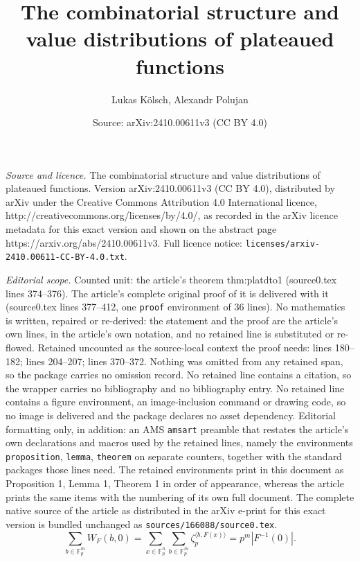 \documentclass[10pt,a4paper]{amsart}
\title{The combinatorial structure and value distributions of plateaued functions}
\author{Lukas K\"olsch, Alexandr Polujan}
\date{Source: arXiv:2410.00611v3 (CC BY 4.0)}
\newcommand{\F}{\mathbb F}
\begin{document}
\maketitle

\noindent\emph{Source and licence.} The combinatorial structure and value distributions of plateaued functions. Version arXiv:2410.00611v3 (CC BY 4.0), distributed by arXiv under the Creative Commons Attribution 4.0 International licence, http://creativecommons.org/licenses/by/4.0/, as recorded in the arXiv licence metadata for this exact version and shown on the abstract page https://arxiv.org/abs/2410.00611v3. Full licence notice: \texttt{licenses/arxiv-2410.00611-CC-BY-4.0.txt}.\par\smallskip

\noindent\textit{Editorial scope.} Counted unit: the article's theorem thm:platdto1 (source0.tex lines 374--376). The article's complete original proof of it is delivered with it (source0.tex lines 377--412, one \texttt{proof} environment of 36 lines). No mathematics is written, repaired or re-derived: the statement and the proof are the article's own lines, in the article's own notation, and no retained line is substituted or re-flowed.  Retained uncounted as the source-local context the proof needs: lines 180--182; lines 204--207; lines 370--372.  Nothing was omitted from any retained span, so the package carries no omission record.  No retained line contains a citation, so the wrapper carries no bibliography and no bibliography entry.  No retained line contains a figure environment, an image-inclusion command or drawing code, so no image is delivered and the package declares no asset dependency.  Editorial formatting only, in addition: an AMS \texttt{amsart} preamble that restates the article's own declarations and macros used by the retained lines, namely the environments \texttt{proposition}, \texttt{lemma}, \texttt{theorem} on separate counters, together with the standard packages those lines need.  The retained environments print in this document as Proposition 1, Lemma 1, Theorem 1 in order of appearance, whereas the article prints the same items with the numbering of its own full document.  The complete native source of the article as distributed in the arXiv e-print for this exact version is bundled unchanged as \texttt{sources/166088/source0.tex}.
\begin{equation} \label{eq:first}
    \sum_{b \in \F_{p}^m}W_F(b,0) = \sum_{x \in \F_{p}^n}\sum_{b \in \F_{p}^m} \zeta_p^{\langle b,F(x)\rangle} = p^m |F^{-1}(0)|.
\end{equation}
\end{document}
